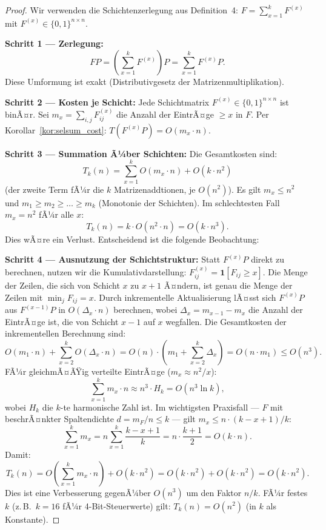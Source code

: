 ﻿\documentclass[a4paper,12pt]{article}
\theoremstyle{definition}
\begin{document}
\begin{proof}
Wir verwenden die Schichtenzerlegung aus Definition~4:
$F = \sum_{x=1}^{k} F^{(x)}$ mit $F^{(x)} \in \{0,1\}^{n\times n}$.

\textbf{Schritt 1 --- Zerlegung:}
\[
    FP = \left(\sum_{x=1}^{k} F^{(x)}\right) P = \sum_{x=1}^{k} F^{(x)} P.
\]
Diese Umformung ist exakt (Distributivgesetz der Matrizenmultiplikation).

\textbf{Schritt 2 --- Kosten je Schicht:}
Jede Schichtmatrix $F^{(x)} \in \{0,1\}^{n\times n}$ ist binÃ¤r.
Sei $m_x = \sum_{i,j} F^{(x)}_{ij}$ die Anzahl der EintrÃ¤ge $\geq x$ in $F$.
Per Korollar~\ref{kor:selsum_cost}: $T(F^{(x)}P) = O(m_x \cdot n)$.

\textbf{Schritt 3 --- Summation Ã¼ber Schichten:}
Die Gesamtkosten sind:
\[
    T_k(n) = \sum_{x=1}^{k} O(m_x \cdot n) + O(k \cdot n^2)
\]
(der zweite Term fÃ¼r die $k$ Matrizenaddtionen, je $O(n^2)$).
Es gilt $m_x \leq n^2$ und $m_1 \geq m_2 \geq \ldots \geq m_k$ (Monotonie der Schichten).
Im schlechtesten Fall $m_x = n^2$ fÃ¼r alle $x$:
\[
    T_k(n) = k \cdot O(n^2 \cdot n) = O(k \cdot n^3).
\]
Dies wÃ¤re ein Verlust. Entscheidend ist die folgende Beobachtung:

\textbf{Schritt 4 --- Ausnutzung der Schichtstruktur:}
Statt $F^{(x)}P$ direkt zu berechnen, nutzen wir die Kumulativdarstellung:
$F^{(x)}_{ij} = \mathbf{1}[F_{ij} \geq x]$.
Die Menge der Zeilen, die sich von Schicht $x$ zu $x+1$ Ã¤ndern, ist genau die
Menge der Zeilen mit $\min_j F_{ij} = x$. Durch inkrementelle Aktualisierung
lÃ¤sst sich $F^{(x)}P$ aus $F^{(x-1)}P$ in $O(\Delta_x \cdot n)$ berechnen,
wobei $\Delta_x = m_{x-1} - m_x$ die Anzahl der EintrÃ¤ge ist, die von Schicht
$x-1$ auf $x$ wegfallen.
Die Gesamtkosten der inkrementellen Berechnung sind:
\[
    O(m_1 \cdot n) + \sum_{x=2}^{k} O(\Delta_x \cdot n)
    = O(n) \cdot \left(m_1 + \sum_{x=2}^{k} \Delta_x\right)
    = O(n \cdot m_1)
    \leq O(n^3).
\]
FÃ¼r gleichmÃ¤ÃŸig verteilte EintrÃ¤ge ($m_x \approx n^2/x$):
\[
    \sum_{x=1}^{k} m_x \cdot n \approx n^3 \cdot H_k = O(n^3 \ln k),
\]
wobei $H_k$ die $k$-te harmonische Zahl ist.
Im wichtigsten Praxisfall --- $F$ mit beschrÃ¤nkter Spaltendichte
$d = m_F/n \leq k$ --- gilt $m_x \leq n \cdot (k - x + 1)/k$:
\[
    \sum_{x=1}^k m_x = n \sum_{x=1}^k \frac{k-x+1}{k}
    = n \cdot \frac{k+1}{2}
    = O(k \cdot n).
\]
Damit:
\[
    T_k(n) = O\!\left(\sum_{x=1}^k m_x \cdot n\right) + O(k \cdot n^2)
    = O(k \cdot n^2) + O(k \cdot n^2)
    = O(k \cdot n^2).
\]
Dies ist eine Verbesserung gegenÃ¼ber $O(n^3)$ um den Faktor $n/k$.
FÃ¼r festes $k$ (z.\,B.\ $k = 16$ fÃ¼r 4-Bit-Steuerwerte) gilt:
$T_k(n) = O(n^2)$ (in $k$ als Konstante).
\end{proof}
\end{document}

